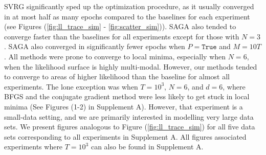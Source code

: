 SVRG significantly sped up the optimization procedure, as it usually converged in at most half as many epochs compared to the baselines for each experiment (see Figures (\ref{fig:ll_trace_sim} - \ref{fig:scatter_sim})). SAGA also tended to converge faster than the baselines for all experiments except for those with $N=3$. SAGA also converged in significantly fewer epochs when $P = \texttt{True}$ and $M=10T$. 
%
All methods were prone to converge to local minima, especially when $N=6$, when the likelihood surface is highly multi-modal. However, our methods tended to converge to areas of higher likelihood than the baseline for almost all experiments. The lone exception was when $T=10^3$, $N=6$, and $d=6$, where BFGS and the conjugate gradient method were less likely to get stuck in local minima (See Figures (1-2) in Supplement A). However, that experiment is a small-data setting, and we are primarily interested in modelling very large data sets. %
%
%
We present figures analogous to Figure (\ref{fig:ll_trace_sim}) for all five data sets corresponding to all experiments in Supplement A. All figures associated experiments where $T=10^3$ can also be found in Supplement A. 

